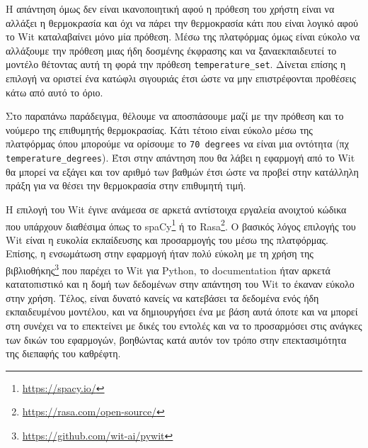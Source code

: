 Η απάντηση όμως δεν είναι ικανοποιητική αφού η πρόθεση του χρήστη είναι να αλλάξει η θερμοκρασία και όχι να πάρει την θερμοκρασία κάτι που είναι λογικό αφού το Wit καταλαβαίνει μόνο μία πρόθεση. Μέσω της πλατφόρμας όμως είναι εύκολο να αλλάξουμε την πρόθεση μιας ήδη δοσμένης έκφρασης και να ξαναεκπαιδευτεί το μοντέλο θέτοντας αυτή τη φορά την πρόθεση \texttt{temperature\_set}. Δίνεται επίσης η επιλογή να οριστεί ένα κατώφλι σιγουριάς έτσι ώστε να μην επιστρέφονται προθέσεις κάτω από αυτό το όριο.

Στο παραπάνω παράδειγμα, θέλουμε να αποσπάσουμε μαζί με την πρόθεση και το νούμερο της επιθυμητής θερμοκρασίας. Κάτι τέτοιο είναι εύκολο μέσω της πλατφόρμας όπου μπορούμε να ορίσουμε το \texttt{70 degrees} να είναι μια οντότητα (πχ \texttt{temperature\_degrees}). Έτσι στην απάντηση που θα λάβει η εφαρμογή από το Wit θα μπορεί να εξάγει και τον αριθμό των βαθμών έτσι ώστε να προβεί στην κατάλληλη πράξη για να θέσει την θερμοκρασία στην επιθυμητή τιμή.

Η επιλογή του Wit έγινε ανάμεσα σε αρκετά αντίστοιχα εργαλεία ανοιχτού κώδικα που υπάρχουν διαθέσιμα όπως το spaCy\footnote{\href{https://spacy.io/}{https://spacy.io/}} ή το Rasa\footnote{\href{https://rasa.com/open-source/}{https://rasa.com/open-source/}}. Ο βασικός λόγος επιλογής του Wit είναι η ευκολία εκπαίδευσης και προσαρμογής του μέσω της πλατφόρμας. Επίσης, η ενσωμάτωση στην εφαρμογή ήταν πολύ εύκολη με τη χρήση της βιβλιοθήκης\footnote{\href{https://github.com/wit-ai/pywit}{https://github.com/wit-ai/pywit}} που παρέχει το Wit για Python, το documentation ήταν αρκετά κατατοπιστικό και η δομή των δεδομένων στην απάντηση του Wit το έκαναν εύκολο στην χρήση. Τέλος, είναι δυνατό κανείς να κατεβάσει τα δεδομένα ενός ήδη εκπαιδευμένου μοντέλου, και να δημιουργήσει ένα με βάση αυτά όποτε και να μπορεί στη συνέχει να το επεκτείνει με δικές του εντολές και να το προσαρμόσει στις ανάγκες των δικών του εφαρμογών, βοηθώντας κατά αυτόν τον τρόπο στην επεκτασιμότητα της διεπαφής του καθρέφτη.